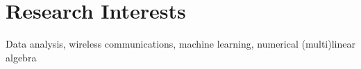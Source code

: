 \section{Research Interests}

Data analysis, wireless communications, machine learning, numerical (multi)linear algebra
